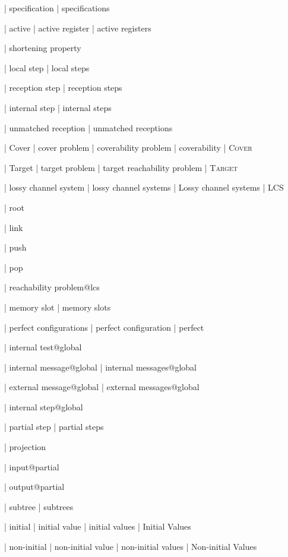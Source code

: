 | specification
| specifications


| active
| active register
| active registers

| shortening property


| local step
| local steps

| reception step
| reception steps

| internal step
| internal steps

| unmatched reception
| unmatched receptions




| Cover
| cover problem
| coverability problem
| coverability
| \textsc{Cover}

| Target
| target problem
| target reachability problem
| \textsc{Target}


| lossy channel system
| lossy channel systems
| Lossy channel systems
| LCS

| root

| link

| push

| pop

| reachability problem@lcs


| memory slot
| memory slots

| perfect configurations
| perfect configuration
| perfect


| internal test@global

| internal message@global
| internal messages@global

| external message@global
| external messages@global

| internal step@global

| partial step
| partial steps

| projection

| input@partial

| output@partial

| subtree
| subtrees

| initial
| initial value
| initial values
| Initial Values

| non-initial
| non-initial value
| non-initial values
| Non-initial Values